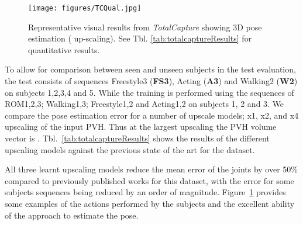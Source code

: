 \documentclass[runningheads]{llncs}
\begin{document}
\begin{figure}[htb]
\centering
\texttt{[image: figures/TCQual.jpg]}
\caption{Representative visual results from {\em TotalCapture} showing 3D pose estimation ( up-scaling). See Tbl. \ref{tab:totalcaptureResults} for quantitative results.}
\label{fig:TCexampleSkels}
\end{figure}To allow for comparison between seen and unseen subjects in the test evaluation, the test consists of sequences Freestyle3 (\textbf{FS3}), Acting (\textbf{A3}) and Walking2 (\textbf{W2}) on subjects 1,2,3,4 and 5. While the training is performed using the sequences of ROM1,2,3; Walking1,3; Freestyle1,2 and Acting1,2  on subjects 1, 2 and 3. We compare the pose estimation error for a number of upscale models; x1, x2, and x4 upscaling of the input PVH. Thus at the largest upscaling the PVH volume vector is . Tbl.~\ref{tab:totalcaptureResults} shows the results of the different upscaling models against the previous state of the art for the dataset.

All three learnt upscaling models reduce the mean error of the joints by over 50\% compared to previously published works for this dataset, with the error for some subjects sequences being reduced by an order of magnitude. Figure~\ref{fig:TCexampleSkels} provides some examples of the actions performed by the subjects and the excellent ability of the approach to estimate the pose.
\end{document}
